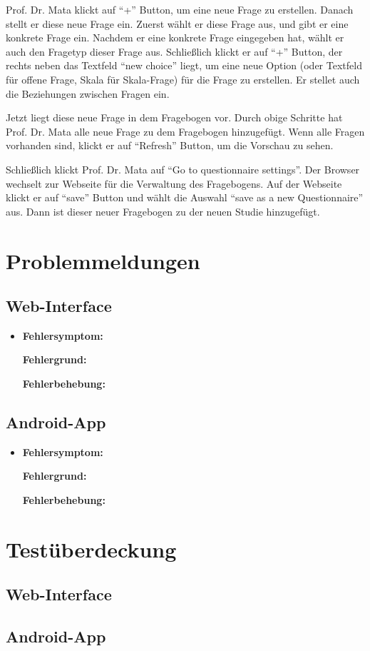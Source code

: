 \documentclass[a4paper]{scrreprt}
\begin{document}
                \par Prof. Dr. Mata klickt auf ``+'' Button, um eine neue Frage zu erstellen. Danach stellt er diese neue Frage ein. Zuerst wählt er diese Frage aus, und gibt er eine konkrete Frage ein. Nachdem er eine konkrete Frage eingegeben hat, wählt er auch den Fragetyp dieser Frage aus. Schließlich klickt er auf ``+'' Button, der rechts neben das Textfeld ``new choice'' liegt, um eine neue Option (oder Textfeld für offene Frage, Skala für Skala-Frage) für die Frage zu erstellen. Er stellet auch die Beziehungen zwischen Fragen ein.
                
                \par Jetzt liegt diese neue Frage in dem Fragebogen vor. Durch obige Schritte hat Prof. Dr. Mata alle neue Frage zu dem Fragebogen hinzugefügt. Wenn alle Fragen vorhanden sind, klickt er auf ``Refresh'' Button, um die Vorschau zu sehen.
                
                \par Schließlich klickt Prof. Dr. Mata auf ``Go to questionnaire settings''. Der Browser wechselt zur Webseite für die Verwaltung des Fragebogens. Auf der Webseite klickt er auf ``save'' Button und wählt die Auswahl ``save as a new Questionnaire'' aus. Dann ist dieser neuer Fragebogen zu der neuen Studie hinzugefügt.
                
	  
	  
      
      
      \newpage
      \chapter{Problemmeldungen}
	      \section{Web-Interface}
		     
		     \begin{itemize}
		     \item \textbf{Fehlersymptom:}
		     \par \textbf{Fehlergrund:}
		     \par \textbf{Fehlerbehebung:}
		     \end{itemize}
		      
		  \section{Android-App}
		  
			  \begin{itemize}
				  \item \textbf{Fehlersymptom:}
				  	\par \textbf{Fehlergrund:}
			  		\par \textbf{Fehlerbehebung:}
			  \end{itemize}
			  
			  
		\newpage
		\chapter{Test\"uberdeckung}
			\section{Web-Interface}
			
			
			\section{Android-App}
              
\end{document}
